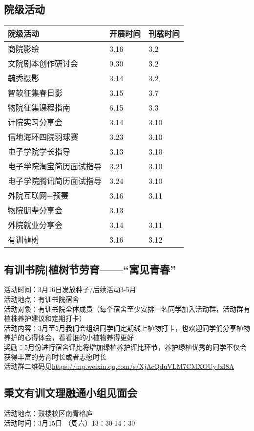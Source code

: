 \documentclass[letterpaper, 12pt]{article}
\begin{document}
\begin{multicols}{2}
\section{院级活动}
\begin{tabular}{|>{\centering\arraybackslash}m{}|m{}|m{}|}
    \hline
    院级活动 & 开展时间 & 刊载时间\\
    \hline\hline
    商院影绘 & 3.16 & 3.2\\
    文院剧本创作研讨会 & 9.30 & 3.2\\
    毓秀摄影 & 3.14 & 3.2\\
    智软征集春日影 & 3.15 & 3.7\\
    物院征集课程指南 & 6.15 & 3.3\\
    计院实习分享会 & 3.14 & 3.10\\
    信地海环四院羽球赛 & 3.23 & 3.10\\
    电子学院学长指导 & 3.13 & 3.10\\
    电子学院淘宝简历面试指导 & 3.21 & 3.10\\
    电子学院腾讯简历面试指导 & 3.24 & 3.10\\
    外院互联网+预赛 & 3.16 & 3.11\\
    物院朋辈分享会 & 3.13 &  \\
    外院就业分享会 & 3.14 & 3.11\\
    有训植树 & 3.16 & 3.12\\
    \hline
\end{tabular}
\subsection{有训书院|植树节劳育——“寓见青春”}
活动时间：3月16日发放种子/后续活动3-5月\\
活动地点：有训书院宿舍\\
活动对象：有训书院全体成员（每个宿舍至少安排一名同学加入活动群，活动群有植株养护建议和定期打卡）\\
活动内容：3月至5月我们会组织同学们定期线上植物打卡，也欢迎同学们分享植物养护的心得体会，看看谁的小植物养得更好\\
奖励：5月份进行宿舍评比将增加绿植养护评比环节，养护绿植优秀的同学不仅会获得丰富的劳育时长或者志愿时长\\
活动群二维码见\url{https://mp.weixin.qq.com/s/XjAcQduVLM7CMXOUyJzI8A}

\subsection{秉文有训文理融通小组见面会}
活动地点：鼓楼校区南青格庐\\
活动时间：3月15日 （周六）13：30-14：30\\


\end{multicols}
\end{document}

